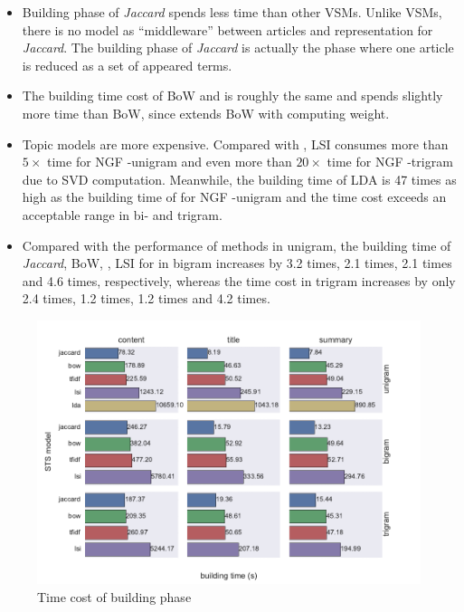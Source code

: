 \begin{itemize}
\item Building phase of \textit{Jaccard} spends less time than other VSMs. Unlike VSMs, there is no model as ``middleware'' between articles and representation for \textit{Jaccard}. The building phase of \textit{Jaccard} is actually the phase where one article is reduced as a set of appeared terms. 

\item The building time cost of BoW and \tfidf{} is roughly the same and \tfidf{} spends slightly more time than BoW, since \tfidf{} extends BoW with computing \tfidf{} weight. 

\item Topic models are more expensive. Compared with \tfidf{}, LSI consumes more than $5 \times$ time for NGF \icontent{}-unigram and even more than $20 \times$ time for NGF \icontent{}-trigram due to SVD computation. Meanwhile, the building time of LDA is 47 times as high as the building time of \tfidf{} for NGF \icontent{}-unigram and the time cost exceeds an acceptable range in bi- and trigram. 

\item Compared with the performance of methods in unigram, the building time of \textit{Jaccard}, BoW, \tfidf{}, LSI for \icontent{} in bigram increases by 3.2 times, 2.1 times, 2.1 times and 4.6 times, respectively, whereas the time cost in trigram increases by only 2.4 times, 1.2 times, 1.2 times and 4.2 times. 

\end{itemize}

\clearpage
\begin{figure}[!htb]
    \centering
    \includegraphics[width=\textwidth]{fig/building_time}
    \caption{Time cost of building phase}
    \label{fig:build_time}
\end{figure}
